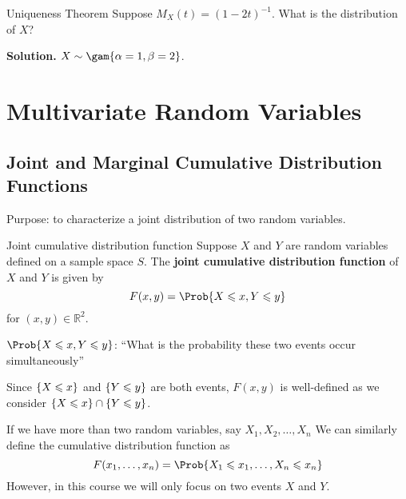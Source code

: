 \begin{Example}{Uniqueness Theorem}{}
    Suppose $ M_X(t)=(1-2t)^{-1} $. What is the
    distribution of $ X $?

    \textbf{Solution.} $ X \sim \gam{\alpha=1,\beta=2}$.
\end{Example}

\chapter{Multivariate Random Variables}
\section{Joint and Marginal Cumulative Distribution Functions}
Purpose: to characterize a joint distribution
of two random variables.
\begin{Definition}{Joint cumulative distribution function}{}
    Suppose $ X $ and $ Y $ are random variables defined on
    a sample space $ S $. The \textbf{joint cumulative
        distribution function} of $ X $ and $ Y $ is given by
    \[ F(x,y)=\Prob{X\leqslant x,Y\leqslant y} \]
    for $ (x,y)\in\mathbb{R}^2 $.
\end{Definition}
$ \Prob{X\leqslant x,Y\leqslant y} $:
``What is the probability these two events occur simultaneously''
\begin{Remark}{}{}
    Since $ \{X\leqslant x\} $ and $ \{Y\leqslant y\} $
    are both events, $ F(x,y) $ is well-defined as
    we consider $ \{X\leqslant x\}\cap \{Y\leqslant y\} $.
\end{Remark}
\begin{Remark}{}{}
    If we have more than two random variables, say $ X_1,X_2,\ldots,X_n $
    We can similarly define the cumulative distribution function as
    \[ F(x_1,\ldots,x_n)=\Prob{X_1\leqslant x_1,\ldots,X_n\leqslant x_n} \]
    However, in this course we will only focus on two events $ X $ and $ Y $.
\end{Remark}

